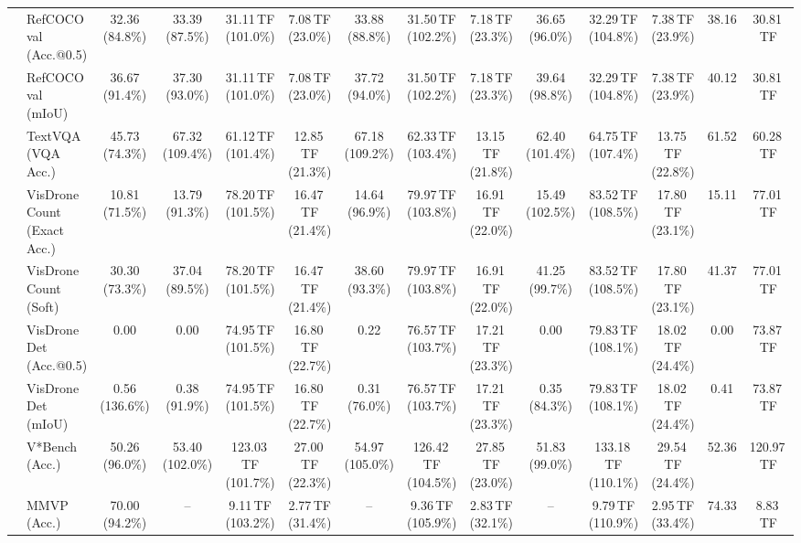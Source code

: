 \begin{table}[t]
\begin{center}
\begin{small}
\begin{sc}
{\begin{tabular}{llcccccccccccc}
& RefCOCO val (Acc.@0.5) & 32.36 (84.8\%) & 33.39 (87.5\%) & 31.11\,TF (101.0\%) & 7.08\,TF (23.0\%) & 33.88 (88.8\%) & 31.50\,TF (102.2\%) & 7.18\,TF (23.3\%) & 36.65 (96.0\%) & 32.29\,TF (104.8\%) & 7.38\,TF (23.9\%) & 38.16 & 30.81\,TF \\
& RefCOCO val (mIoU) & 36.67 (91.4\%) & 37.30 (93.0\%) & 31.11\,TF (101.0\%) & 7.08\,TF (23.0\%) & 37.72 (94.0\%) & 31.50\,TF (102.2\%) & 7.18\,TF (23.3\%) & 39.64 (98.8\%) & 32.29\,TF (104.8\%) & 7.38\,TF (23.9\%) & 40.12 & 30.81\,TF \\
& TextVQA (VQA Acc.) & 45.73 (74.3\%) & 67.32 (109.4\%) & 61.12\,TF (101.4\%) & 12.85\,TF (21.3\%) & 67.18 (109.2\%) & 62.33\,TF (103.4\%) & 13.15\,TF (21.8\%) & 62.40 (101.4\%) & 64.75\,TF (107.4\%) & 13.75\,TF (22.8\%) & 61.52 & 60.28\,TF \\
& VisDrone Count (Exact Acc.) & 10.81 (71.5\%) & 13.79 (91.3\%) & 78.20\,TF (101.5\%) & 16.47\,TF (21.4\%) & 14.64 (96.9\%) & 79.97\,TF (103.8\%) & 16.91\,TF (22.0\%) & 15.49 (102.5\%) & 83.52\,TF (108.5\%) & 17.80\,TF (23.1\%) & 15.11 & 77.01\,TF \\
& VisDrone Count (Soft) & 30.30 (73.3\%) & 37.04 (89.5\%) & 78.20\,TF (101.5\%) & 16.47\,TF (21.4\%) & 38.60 (93.3\%) & 79.97\,TF (103.8\%) & 16.91\,TF (22.0\%) & 41.25 (99.7\%) & 83.52\,TF (108.5\%) & 17.80\,TF (23.1\%) & 41.37 & 77.01\,TF \\
& VisDrone Det (Acc.@0.5) & 0.00 & 0.00 & 74.95\,TF (101.5\%) & 16.80\,TF (22.7\%) & 0.22 & 76.57\,TF (103.7\%) & 17.21\,TF (23.3\%) & 0.00 & 79.83\,TF (108.1\%) & 18.02\,TF (24.4\%) & 0.00 & 73.87\,TF \\
& VisDrone Det (mIoU) & 0.56 (136.6\%) & 0.38 (91.9\%) & 74.95\,TF (101.5\%) & 16.80\,TF (22.7\%) & 0.31 (76.0\%) & 76.57\,TF (103.7\%) & 17.21\,TF (23.3\%) & 0.35 (84.3\%) & 79.83\,TF (108.1\%) & 18.02\,TF (24.4\%) & 0.41 & 73.87\,TF \\
& V*Bench (Acc.) & 50.26 (96.0\%) & 53.40 (102.0\%) & 123.03\,TF (101.7\%) & 27.00\,TF (22.3\%) & 54.97 (105.0\%) & 126.42\,TF (104.5\%) & 27.85\,TF (23.0\%) & 51.83 (99.0\%) & 133.18\,TF (110.1\%) & 29.54\,TF (24.4\%) & 52.36 & 120.97\,TF \\
\midrule
{}
& MMVP (Acc.) & 70.00 (94.2\%) & -- & 9.11\,TF (103.2\%) & 2.77\,TF (31.4\%) & -- & 9.36\,TF (105.9\%) & 2.83\,TF (32.1\%) & -- & 9.79\,TF (110.9\%) & 2.95\,TF (33.4\%) & 74.33 & 8.83\,TF \\

\end{tabular}}
\end{sc}
\end{small}
\end{center}
\end{table}
